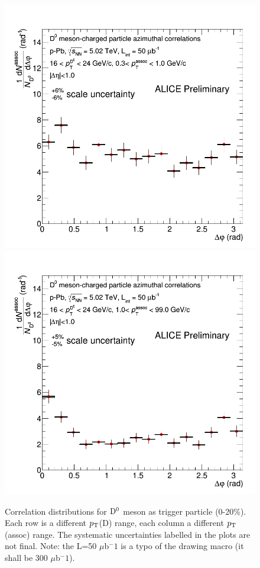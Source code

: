 \begin{figure}
{\includegraphics[width=0.32\linewidth]{figuresVsCent/Dzero/Correlations/020/CanvaAndVariedHistopPbDzeroPt16to24assocPt03to1.png}}
{\includegraphics[width=0.32\linewidth]{figuresVsCent/Dzero/Correlations/020/CanvaAndVariedHistopPbDzeroPt16to24assocPt1to99.png}}
 \caption{Correlation distributions for ${\rm D^0}$ meson as trigger particle (0-20\%). Each row is a different $p_{\rm T}$(D) range, each column a different $p_{\rm T}$(assoc) range. The systematic uncertainties labelled in the plots are not final. Note: the L=50 $\mu$b$^-1$ is a typo of the drawing macro (it shall be 300 $\mu$b$^-1$).}
\label{fig:Dzerocorr020}
\end{figure}

